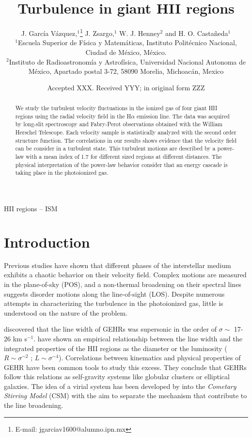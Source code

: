 \documentclass[fleqn,usenatbib]{mnras}
\title[Turbulence in GHRs]{Turbulence in giant HII regions}
\author[J. García-Vázquez et al.]{
J. García Vázquez,$^{1}$\thanks{E-mail: jgarciav1600@alumno.ipn.mx}
J. Zsargo,$^{1}$
W. J. Henney$^{2}$
and H. O. Castañeda$^{1}$
\\
$^{1}$Escuela Superior de Física y Matemáticas, Instituto Politécnico Nacional, Ciudad de México, México.\\
$^{2}$Instituto de Radioastronomía y Astrofísica, Universidad Nacional Autonoma de México, Apartado postal 3-72, 58090 Morelia, Michoacán, Mexico\\
}
\date{Accepted XXX. Received YYY; in original form ZZZ}
\newcommand\kms{$^{-1}$}
\begin{document}
\label{firstpage}
\pagerange{\pageref{firstpage}--\pageref{lastpage}}
\maketitle

\begin{abstract}

We study the turbulent velocity fluctuations in the ionized gas of four giant HII regions using the radial velocity field in the H$\alpha$ emission line. The data was acquired by long-slit spectroscopy and Fabry-Perot observations obtained with the William Herschel Telescope. Each velocity sample is statistically analyzed with the second order structure function. The correlations in our results shows evidence that the velocity field can be consider in a turbulent state. This turbulent motions are described by a power-law with a mean index of 1.7 for different sized regions at different distances. The physical interpretation of the power-law behavior consider that an energy cascade is taking place in the photoionized gas.
\end{abstract}

\begin{keywords}
HII regions -- ISM
\end{keywords}



\section{Introduction}

Previous studies \citep{1999intu.conf.....F,2004ARA&A..42..211E,scalo2004interstellar} have shown that different phases of the interstellar medium exhibits a chaotic behavior on their velocity field. Complex motions are measured in the plane-of-sky (POS), and a non-thermal broadening on their spectral lines suggests disorder motions along the line-of-sight (LOS). Despite numerous attempts in characterizing the turbulence in the photoionized gas, little is understood on the nature of the problem.

\citet{smith1970} discovered that the line width of GEHRs was supersonic in the order of $\sigma \sim$ 17-26 km s\kms. \citet{melnick1977,terlevich1981} have shown an empirical relationship between the line width and the integrated properties of the HII regions as the diameter or the luminosity ($R \sim \sigma ^{\sim 2}$ ; $L \sim \sigma ^{\sim 4}$). Correlations between kinematics and physical properties of GEHR have been common tools to study this excess. They conclude that GEHRs follow this relations as self-gravity systems like globular clusters or elliptical galaxies. The idea of a virial system has been developed by \citet{1993ApJ...418..767T,munoz1996} into the \textit{Cometary Stirring Model} (CSM) with the aim to separate the mechanism that contribute to the line broadening. 
\end{document}
